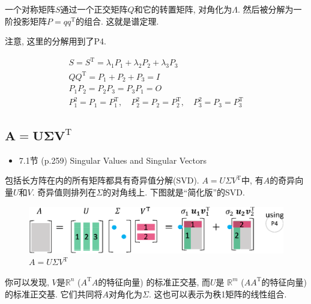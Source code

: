 \documentclass[letterpaper]{article}
\DeclareRobustCommand\transp{^{\mathrm{T}}}
\begin{document}
一个对称矩阵$S$通过一个正交矩阵$Q$和它的转置矩阵, 对角化为$\Lambda$. 
然后被分解为一阶投影矩阵$P=qq\transp$的组合. 这就是谱定理. 

注意, 这里的分解用到了P4.

\begin{gather*}
  S=S\transp = \lambda_1 P_1 + \lambda_2 P_2 + \lambda_3 P_3\\
  QQ\transp = P_1 + P_2 + P_3 = I \\
  P_1 P_2 = P_2 P_3 = P_3 P_1 = O\\
  P_1^2 =P_1=P_1\transp, \quad P_2^2=P_2=P_2\transp, \quad P_3^2=P_3=P_3\transp
\end{gather*}

\subsection{$\boldsymbol{A=U \Sigma V\transp}$}


\begin{itemize}
  \item 7.1节 (p.259) Singular Values and Singular Vectors
\end{itemize}

包括长方阵在内的所有矩阵都具有奇异值分解(SVD). 
$A=U \Sigma V\transp$中, 有$A$的奇异向量$U$和$V$. 
奇异值则排列在$\Sigma$的对角线上. 
下图就是“简化版”的SVD. 


\begin{figure}[H]
  \centering
  \includegraphics[scale=0.8]{SVD.eps}
  \caption{$A=U \Sigma V\transp$}
\end{figure}

你可以发现, $V$是$\mathbb{R}^n$ ($A\transp A$的特征向量) 的标准正交基, 
而$U$是 $\mathbb{R}^m$ ($AA\transp$的特征向量) 的标准正交基. 
它们共同将$A$对角化为$\Sigma$. 
这也可以表示为秩1矩阵的线性组合. 
\end{document}
